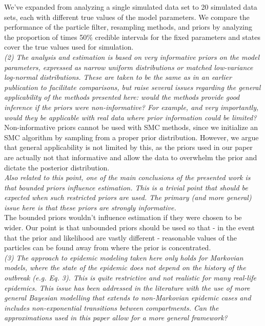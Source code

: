 \documentclass{article}
\begin{document}
We've expanded from analyzing a single simulated data set to 20 simulated data sets, each with different true values of the model parameters. We compare the performance of the particle filter, resampling methods, and priors by analyzing the proportion of times 50\% credible intervals for the fixed parameters and states cover the true values used for simulation. \\

\noindent \emph{(2) The analysis and estimation is based on very informative priors on the model parameters, expressed as narrow uniform distributions or matched low-variance log-normal distributions. These are taken to be the same as in an earlier publication to facilitate comparisons, but raise several issues regarding the general applicability of the methods presented here: would the methods provide good inference if the priors were non-informative? For example, and very importantly, would they be applicable with real data where prior information could be limited?} \\

Non-informative priors cannot be used with SMC methods, since we initialize an SMC algorithm by sampling from a proper prior distribution. However, we argue that general applicability is not limited by this, as the priors used in our paper are actually not that informative and allow the data to overwhelm the prior and dictate the posterior distribution. \\

\noindent \emph{Also related to this point, one of the main conclusions of the presented work is that bounded priors influence estimation. This is a trivial point that should be expected when such restricted priors are used. The primary (and more general) issue here is that these priors are strongly informative.} \\

The bounded priors wouldn't influence estimation if they were chosen to be wider. Our point is that unbounded priors should be used so that - in the event that the prior and likelihood are vastly different - reasonable values of the particles can be found away from where the prior is concentrated. \\

\noindent \emph{(3) The approach to epidemic modeling taken here only holds for Markovian models, where the state of the epidemic does not depend on the history of the outbreak (e.g. Eq. 3). This is quite restrictive and not realistic for many real-life epidemics. This issue has been addressed in the literature with the use of more general Bayesian modelling that extends to non-Markovian epidemic cases and includes non-exponential transitions between compartments. Can the approximations used in this paper allow for a more general framework?} \\
\end{document}
